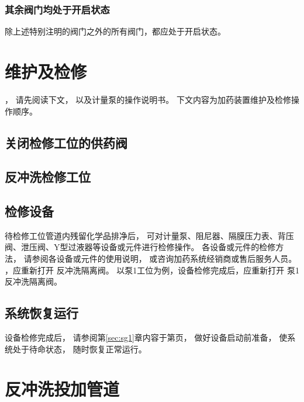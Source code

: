 \documentclass[UTF8,a4paper,12pt,titlepage]{ctexart}
\begin{document}
        \subsubsection{其余阀门均处于开启状态}
        除上述特别注明的阀门之外的所有阀门，都应处于开启状态。

\newpage

\section{维护及检修}
，
请先阅读下文，
以及计量泵的操作说明书。
下文内容为加药装置维护及检修操作顺序。

    \subsection{关闭检修工位的供药阀}\label{sec:sg2}
    
    

\newpage


    \subsection{反冲洗检修工位}
    

    \subsection{检修设备}
    待检修工位管道内残留化学品排净后，
    可对计量泵、阻尼器、隔膜压力表、背压阀、泄压阀、Y型过液器等设备或元件进行检修操作。
    各设备或元件的检修方法，
    请参阅各设备或元件的使用说明，
    或咨询加药系统经销商或售后服务人员。
    ，应重新打开 反冲洗隔离阀。
    以泵1工位为例，设备检修完成后，应重新打开 泵1反冲洗隔离阀。

    \subsection{系统恢复运行}
    设备检修完成后，
    请参阅第\ref{sec:sg1}章内容于第\pageref{sec:sg1}页，
    做好设备启动前准备，
    使系统处于待命状态，
    随时恢复正常运行。

\section{反冲洗投加管道}
    
\end{document}
